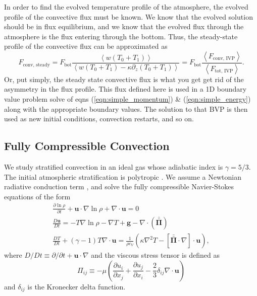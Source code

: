 \documentclass[aps, pre, onecolumn, nofootinbib, notitlepage, groupedaddress, amsfonts, amssymb, amsmath, longbibliography]{revtex4-1}
\newcommand{\Div}[1]{\ensuremath{\nabla\cdot\left( #1\right)}}
\newcommand{\DivU}{\ensuremath{\nabla\cdot\bm{u}}}
\newcommand{\angles}[1]{\ensuremath{\left\langle #1 \right\rangle}}
\newcommand{\grad}{\ensuremath{\nabla}}
\newcommand{\stressT}{\ensuremath{\bm{\bar{\bar{\Pi}}}}}
\begin{document}
In order to find the evolved temperature profile of the atmosphere, the evolved profile of the convective flux must
be known.  We know that the evolved solution should be in flux equilibrium, and we know that the evolved flux through
the atmosphere is the flux entering through the bottom.  Thus, the steady-state profile of the convective flux can be
approximated as
\begin{equation}
F_{\text{conv, steady}} = F_{\text{bot}}\frac{\angles{w(T_0 + T_1)}}{\angles{w(T_0 + T_1) - \kappa \partial_z (T_0 + T_1)}}
= F_{\text{bot}}\frac{\angles{F_{\text{conv, IVP}}}}{\angles{F_{\text{tot, IVP}}}}.
\end{equation}
Or, put simply, the steady state convective flux is what you get get rid of the asymmetry in the flux profile.
This flux defined here is used in a 1D boundary value problem solve of 
eqns (\ref{eqn:simple_momentum}) \& (\ref{eqn:simple_energy}) along with the appropriate boundary values.  The solution
to that BVP is then used as new initial conditions, convection restarts, and so on.

\subsection{Fully Compressible Convection}
We study stratified convection in an ideal gas whose adiabatic index is $\gamma = 5/3$.
The initial atmospheric stratification is polytropic \cite{anders&brown2017}.
We assume a Newtonian radiative conduction term \cite{lecoanet&all2014}, and solve the
fully compressible Navier-Stokes equations of the form
\begin{gather}
\frac{\partial \ln \rho}{\partial t} + \bm{u}\cdot\grad\ln\rho + \DivU = 0
	\label{eqn:FC_continuity}
\\
\frac{D \bm{u}}{Dt} = -T\grad\ln\rho - \grad T + \bm{g} - \Div{\stressT}
	\label{eqn:FC_momentum}
\\
\frac{D T}{D t} + (\gamma-1)T\DivU = 
\frac{1}{\rho c_V}\left(\kappa\grad^2 T - [\stressT\cdot\grad]\cdot\bm{u}\right),
	\label{eqn:FC_energy}
\end{gather}
where $D/Dt \equiv \partial/\partial t + \bm{u}\cdot\grad$ and the viscous stress
tensor is defined as
\begin{equation}
\Pi_{ij} \equiv -\mu\left(\frac{\partial u_i}{\partial x_j} + \frac{\partial u_j}{\partial x_i} - \frac{2}{3}\delta_{ij
}\DivU\right)
\label{eqn:stress_tensor}
\end{equation}
and $\delta_{ij}$ is the Kronecker delta function.
\end{document}
